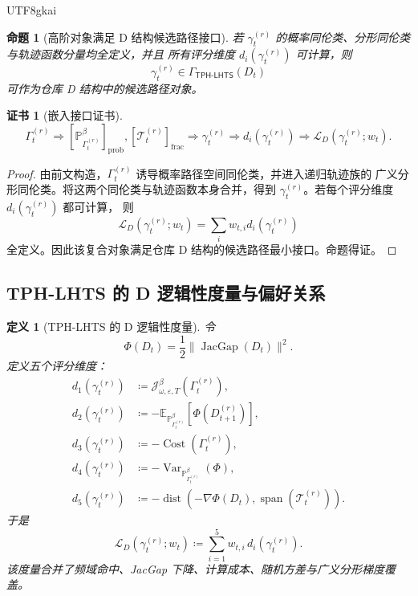 \documentclass[12pt]{article}
\newtheorem{definition}{定义}[section]
\newtheorem{proposition}{命题}[section]
\newtheorem{Certificate}{证书}[section]
\newcommand{\TPHLHTS}{\ensuremath{\mathsf{TPH\mbox{-}LHTS}}}
\newcommand{\DefEq}{\coloneqq}
\newcommand{\Prob}{\mathbb P}
\newcommand{\E}{\mathbb E}
\DeclareMathOperator{\Cost}{Cost}
\DeclareMathOperator{\JacGap}{JacGap}
\DeclareMathOperator{\Span}{span}
\DeclareMathOperator{\dist}{dist}
\DeclareMathOperator{\Var}{Var}
\begin{document}
\begin{CJK*}{UTF8}{gkai}
\begin{proposition}[高阶对象满足 D 结构候选路径接口]
若 \(\gamma_t^{(r)}\) 的概率同伦类、分形同伦类与轨迹函数分量均全定义，并且
所有评分维度 \(d_i(\gamma_t^{(r)})\) 可计算，则
\[
\gamma_t^{(r)}\in\Gamma_{\TPHLHTS}(D_t)
\]
可作为仓库 D 结构中的候选路径对象。
\end{proposition}

\begin{Certificate}[嵌入接口证书]
\[
\boxed{
\Gamma_t^{(r)}
\Rightarrow
[\mathbb P_{\Gamma_t^{(r)}}^\beta]_{\mathrm{prob}},
[\mathcal T_t^{(r)}]_{\mathrm{frac}}
\Rightarrow
\gamma_t^{(r)}
\Rightarrow
d_i(\gamma_t^{(r)})
\Rightarrow
\mathcal L_D(\gamma_t^{(r)};w_t).
}
\]
\end{Certificate}

\begin{proof}
由前文构造，\(\Gamma_t^{(r)}\) 诱导概率路径空间同伦类，并进入递归轨迹族的
广义分形同伦类。将这两个同伦类与轨迹函数本身合并，得到
\(\gamma_t^{(r)}\)。若每个评分维度 \(d_i(\gamma_t^{(r)})\) 都可计算，
则
\[
\mathcal L_D(\gamma_t^{(r)};w_t)=\sum_iw_{t,i}d_i(\gamma_t^{(r)})
\]
全定义。因此该复合对象满足仓库 D 结构的候选路径最小接口。命题得证。
\end{proof}

\subsection{TPH-LHTS 的 D 逻辑性度量与偏好关系}
\label{subsec:tph-lhts-d-logical-metric}

\begin{definition}[TPH-LHTS 的 D 逻辑性度量]
令
\[
\Phi(D_t)=\frac12\|\JacGap(D_t)\|^2.
\]
定义五个评分维度：
\[
\begin{aligned}
d_1(\gamma_t^{(r)})
&\DefEq
\mathcal J_{\omega,\varepsilon,T}^{\beta}(\Gamma_t^{(r)}),\\
d_2(\gamma_t^{(r)})
&\DefEq
-\E_{\Prob_{\Gamma_t^{(r)}}^\beta}
\left[\Phi(D_{t+1}^{(r)})\right],\\
d_3(\gamma_t^{(r)})
&\DefEq
-\Cost(\Gamma_t^{(r)}),\\
d_4(\gamma_t^{(r)})
&\DefEq
-\Var_{\Prob_{\Gamma_t^{(r)}}^\beta}(\Phi),\\
d_5(\gamma_t^{(r)})
&\DefEq
-\dist\!\left(
-\nabla\Phi(D_t),
\Span(\mathcal T_t^{(r)})
\right).
\end{aligned}
\]
于是
\[
\boxed{
\mathcal L_D(\gamma_t^{(r)};w_t)
\DefEq
\sum_{i=1}^{5}w_{t,i}\,d_i(\gamma_t^{(r)}).
}
\]
该度量合并了频域命中、JacGap 下降、计算成本、随机方差与广义分形梯度覆盖。
\end{definition}


\end{CJK*}
\end{document}
